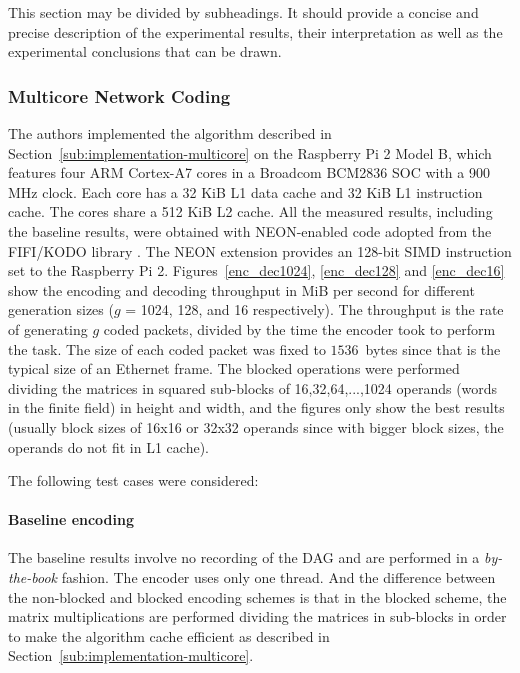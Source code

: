 \label{sec:measurements}

This section may be divided by subheadings. It should provide a concise and
precise description of the experimental results, their interpretation as well as
the experimental conclusions that can be drawn.

\subsubsection{Multicore Network Coding}
\label{subs:multicore-network-coding}

The authors implemented the algorithm described in
Section~\ref{sub:implementation-multicore} on the Raspberry Pi 2 Model B, which
features four ARM Cortex-A7 cores in a Broadcom BCM2836 \ac{SOC} with a 900 MHz
clock. Each core has a 32 KiB L1 data cache and 32 KiB L1 instruction cache. The
cores share a 512 KiB L2 cache. All the measured results, including the baseline
results, were obtained with NEON-enabled code adopted from the FIFI/KODO library
\cite{kodo2011pedersen}. The NEON extension provides an 128-bit \ac{SIMD}
instruction set to the Raspberry Pi 2. Figures~\ref{enc_dec1024},
\ref{enc_dec128} and \ref{enc_dec16} show the encoding and decoding throughput
in MiB per second for different generation sizes ($g$ = 1024, 128, and 16
respectively). The throughput is the rate of generating $g$ coded packets,
divided by the time the encoder took to perform the task. The size of each coded
packet was fixed to $1536$~bytes since that is the typical size of an Ethernet
frame. The blocked operations were performed dividing the matrices in squared
sub-blocks of 16,32,64,...,1024 operands (words in the finite field) in height
and width, and the figures only show the best results (usually block sizes of
16x16 or 32x32 operands since with bigger block sizes, the operands do not fit
in L1 cache).

The following test cases were considered:

\paragraph{Baseline encoding} The baseline results involve no recording of the
\ac{DAG} and are performed in a \emph{by-the-book} fashion. The encoder uses
only one thread. And the difference between the non-blocked and blocked encoding
schemes is that in the blocked scheme, the matrix multiplications are performed
dividing the matrices in sub-blocks in order to make the algorithm cache
efficient as described in Section~\ref{sub:implementation-multicore}.

